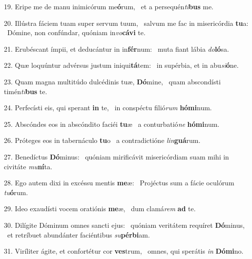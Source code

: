 19. Eripe me de manu inimicórum me\textbf{ó}rum, \ast\  et a persequén\textit{ti}\textbf{bus} me.\

20. Illústra fáciem tuam super servum tuum, \dag\  salvum me fac in misericórdia \textbf{tu}a: \ast\  Dómine, non confúndar, quóniam in\textit{vo}\textbf{cá}\textbf{vi} te.\

21. Erubéscant ímpii, et deducántur in in\textbf{fér}num: \ast\  muta fiant lábia \textit{do}\textbf{ló}sa.\

22. Quæ loquúntur advérsus justum iniqui\textbf{tá}tem: \ast\  in supérbia, et in abu\textit{si}\textbf{ó}ne.\

23. Quam magna multitúdo dulcédinis tuæ, \textbf{Dó}mine, \ast\  quam abscondísti timén\textit{ti}\textbf{bus} te.\

24. Perfecísti eis, qui sperant \textbf{in} te, \ast\  in conspéctu filió\textit{rum} \textbf{hó}\textbf{mi}num.\

25. Abscóndes eos in abscóndito faciéi \textbf{tu}æ \ast\  a conturbatió\textit{ne} \textbf{hó}\textbf{mi}num.\

26. Próteges eos in tabernáculo \textbf{tu}o \ast\  a contradictióne \textit{lin}\textbf{guá}rum.\

27. Benedíctus \textbf{Dó}minus: \ast\  quóniam mirificávit misericórdiam suam mihi in civitáte \textit{mu}\textbf{ní}ta.\

28. Ego autem dixi in excéssu mentis \textbf{me}æ: \ast\  Projéctus sum a fácie oculórum \textit{tu}\textbf{ó}rum.\

29. Ideo exaudísti vocem oratiónis \textbf{me}æ, \ast\  dum clamá\textit{rem} \textbf{ad} te.\

30. Dilígite Dóminum omnes sancti ejus: \dag\  quóniam veritátem requíret \textbf{Dó}minus, \ast\  et retríbuet abundánter faciéntibus \textit{su}\textbf{pér}\textbf{bi}am.\

31. Viríliter ágite, et confortétur cor \textbf{ves}trum, \ast\  omnes, qui sperátis \textit{in} \textbf{Dó}\textbf{mi}no.\

